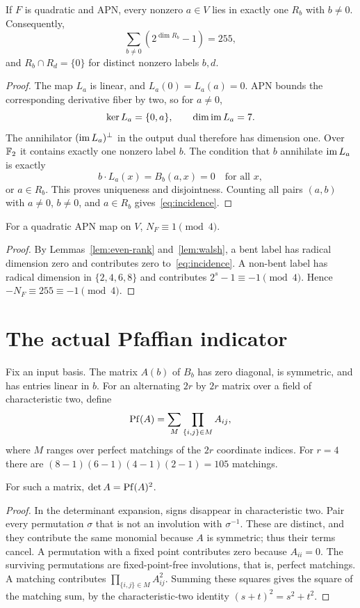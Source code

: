 \begin{proposition}\label{prop:partition}
If $F$ is quadratic and APN, every nonzero $a\in V$ lies in exactly one $R_b$ with $b\ne0$. Consequently,
\begin{equation}\label{eq:incidence}
\sum_{b\ne0}(2^{\dim R_b}-1)=255,
\end{equation}
and $R_b\cap R_d=\{0\}$ for distinct nonzero labels $b,d$.
\end{proposition}
\begin{proof}
The map $L_a$ is linear, and $L_a(0)=L_a(a)=0$. APN bounds the corresponding derivative fiber by two, so for $a\ne0$,
\[
\ker L_a=\{0,a\},\qquad \dim\operatorname{im} L_a=7.
\]
The annihilator $(\operatorname{im} L_a)^\perp$ in the output dual therefore has dimension one. Over $\mathbb F_2$ it contains exactly one nonzero label $b$. The condition that $b$ annihilate $\operatorname{im} L_a$ is exactly
\[
b\cdot L_a(x)=B_b(a,x)=0\quad\text{for all }x,
\]
or $a\in R_b$. This proves uniqueness and disjointness. Counting all pairs $(a,b)$ with $a\ne0$, $b\ne0$, and $a\in R_b$ gives~\eqref{eq:incidence}.
\end{proof}

\begin{corollary}\label{cor:congruence}
For a quadratic APN map on $V$, $N_F\equiv1\pmod4$.
\end{corollary}
\begin{proof}
By Lemmas~\ref{lem:even-rank} and~\ref{lem:walsh}, a bent label has radical dimension zero and contributes zero to~\eqref{eq:incidence}. A non-bent label has radical dimension in $\{2,4,6,8\}$ and contributes $2^s-1\equiv-1\pmod4$. Hence $-N_F\equiv255\equiv-1\pmod4$.
\end{proof}

\section{The actual Pfaffian indicator}\label{sec:pfaffian}
Fix an input basis. The matrix $A(b)$ of $B_b$ has zero diagonal, is symmetric, and has entries linear in $b$. For an alternating $2r$ by $2r$ matrix over a field of characteristic two, define
\[
\operatorname{Pf}(A)=\sum_{M}\prod_{\{i,j\}\in M}A_{ij},
\]
where $M$ ranges over perfect matchings of the $2r$ coordinate indices. For $r=4$ there are $(8-1)(6-1)(4-1)(2-1)=105$ matchings.

\begin{lemma}\label{lem:pfaffian-det}
For such a matrix, $\det A=\operatorname{Pf}(A)^2$.
\end{lemma}
\begin{proof}
In the determinant expansion, signs disappear in characteristic two. Pair every permutation $\sigma$ that is not an involution with $\sigma^{-1}$. These are distinct, and they contribute the same monomial because $A$ is symmetric; thus their terms cancel. A permutation with a fixed point contributes zero because $A_{ii}=0$. The surviving permutations are fixed-point-free involutions, that is, perfect matchings. A matching contributes $\prod_{\{i,j\}\in M}A_{ij}^2$. Summing these squares gives the square of the matching sum, by the characteristic-two identity $(s+t)^2=s^2+t^2$.
\end{proof}

